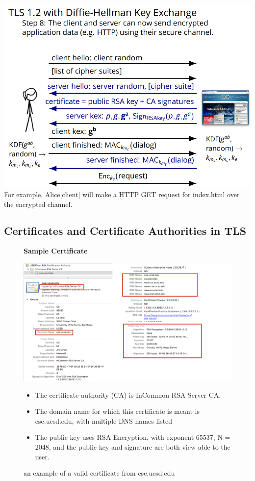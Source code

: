 \documentclass[11pt]{article} %
\begin{document}
{\includegraphics[scale=1.2]{./DiffieStep8.png}
\\

For example, Alice[client] will make a HTTP GET request for index.html over 
the encrypted channel.

\newpage
\subsection{Certificates and Certificate Authorities in TLS}

\newpage
\begin{figure}[H]
    \centering
    \textbf{Sample Certificate}\par\medskip
    \includegraphics[scale=.4]{./cert1.png}
    \caption{an example of a valid certificate from cse.ucsd.edu}
    \begin{itemize}
      \item  The certificate authority (CA) is InCommon RSA Server CA.
      \item The domain name for which this certificate is meant is cse.ucsd.edu, with multiple DNS names listed
      \item The public key uses RSA Encryption, with exponent 65537, N = 2048, and the public key and signature are both view able to the user.
    \end{itemize}
\end{figure}
\newpage

}
\end{document}
